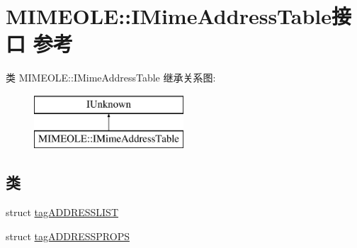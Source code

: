 \hypertarget{interface_m_i_m_e_o_l_e_1_1_i_mime_address_table}{}\section{M\+I\+M\+E\+O\+LE\+:\+:I\+Mime\+Address\+Table接口 参考}
\label{interface_m_i_m_e_o_l_e_1_1_i_mime_address_table}
类 M\+I\+M\+E\+O\+LE\+:\+:I\+Mime\+Address\+Table 继承关系图\+:\begin{figure}[H]
\begin{center}
\leavevmode
\includegraphics[height=2.000000cm]{interface_m_i_m_e_o_l_e_1_1_i_mime_address_table}
\end{center}
\end{figure}
\subsection*{类}
\begin{DoxyCompactItemize}
\item 
struct \hyperlink{struct_m_i_m_e_o_l_e_1_1_i_mime_address_table_1_1tag_a_d_d_r_e_s_s_l_i_s_t}{tag\+A\+D\+D\+R\+E\+S\+S\+L\+I\+ST}
\item 
struct \hyperlink{struct_m_i_m_e_o_l_e_1_1_i_mime_address_table_1_1tag_a_d_d_r_e_s_s_p_r_o_p_s}{tag\+A\+D\+D\+R\+E\+S\+S\+P\+R\+O\+PS}
\end{DoxyCompactItemize}
